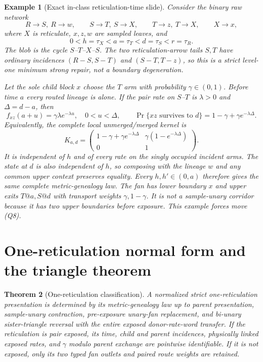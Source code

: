 \documentclass[11pt]{article}
\newtheorem{theorem}{Theorem}[section]
\newtheorem{example}[theorem]{Example}
\begin{document}
\begin{example}[Exact in-class reticulation-time slide]
\label{ex:unary-fan-slide}
Consider the binary raw network
\[
 R\to S,\ R\to w,\qquad
 S\to T,\ S\to X,\qquad
 T\to z,\ T\to X,\qquad X\to x,
\]
where $X$ is reticulate, $x,z,w$ are sampled leaves, and
\[
 0<h=\tau_X<a=\tau_T<d=\tau_S<r=\tau_R.
\]
The blob is the cycle $S$--$T$--$X$--$S$.  The two reticulation-arrow
tails $S,T$ have ordinary incidences $(R\!-
S,S\!-\!T)$ and $(S\!-\!T,T\!-\!z)$, so this is a strict level-one
minimum strong repair, not a boundary degeneration.

Let the sole child block $x$ choose the $T$ arm with probability
$\gamma\in(0,1)$.  Before time $a$ every routed lineage is alone.  If the pair
rate on $S$--$T$ is $\lambda>0$ and $\Delta=d-a$, then
\[
 f_{xz}(a+u)=\gamma\lambda e^{-\lambda u},\quad 0<u<\Delta,
 \qquad
 \Pr\{xz\text{ survives to }d\}=1-\gamma+\gamma e^{-\lambda\Delta}.
\]
Equivalently, the complete local unmerged/merged kernel is
\[
 K_{a,d}=
 \begin{pmatrix}
 1-\gamma+\gamma e^{-\lambda\Delta}&
 \gamma(1-e^{-\lambda\Delta})\\
 0&1
 \end{pmatrix}.
\]
It is independent of $h$ and of every rate on the singly occupied incident
arms.  The state at $d$ is also independent of $h$, so composing with the
lineage $w$ and any common upper context preserves equality.  Every
$h,h'\in(0,a)$ therefore gives the same complete metric-genealogy law.  The
fan has lower boundary $x$ and upper exits $T@a,S@d$ with transport weights
$\gamma,1-\gamma$.  It is not a sample-unary corridor because it has two upper
boundaries before exposure.  This example forces move (Q8).
\end{example}


\section{One-reticulation normal form and the triangle theorem}
\label{sec:triangle}

\begin{theorem}[One-reticulation classification]
\label{thm:one-retic}
A normalized strict one-reticulation presentation is determined by its
metric-genealogy law up to parent presentation, sample-unary contraction,
pre-exposure unary-fan replacement, and bi-unary sister-triangle reversal with
the entire exposed donor-rate-word transfer.  If the reticulation is pair exposed, its time, child
and parent incidences, physically linked exposed rates, and $\gamma$ modulo
parent exchange are pointwise identifiable.  If it is not exposed, only its
two typed fan outlets and paired route weights are retained.
\end{theorem}
\end{document}
